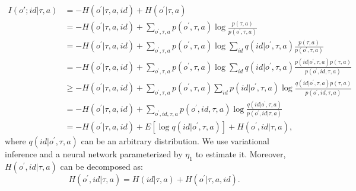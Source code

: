 \begin{equation}
\begin{aligned} 
I(o'; id | \tau, a) &=-H\left(o^{\prime} | \tau, a, id\right)+H\left(o^{\prime} | \tau, a\right) 
\\ &= -H\left(o^{\prime} | \tau, a, id\right)+ \sum_{o^{\prime}, \tau, a}p(o^{\prime}, \tau, a)\log \frac{p(\tau, a)}{p(o^{\prime}, \tau, a)}
\\ &= -H\left(o^{\prime} | \tau, a, id\right)+\sum_{o^{\prime}, \tau, a}p(o^{\prime}, \tau, a)\log \sum_{id} q\left(id | o^{\prime}, \tau, a\right)\frac{p(\tau, a)}{p(o^{\prime}, \tau, a)}
\\ &= -H\left(o^{\prime} | \tau, a, id\right)+\sum_{o^{\prime}, \tau, a}p(o^{\prime}, \tau, a)\log \sum_{id} q\left(id | o^{\prime}, \tau, a\right)\frac{p(id|o^{\prime}, \tau, a)p(\tau, a)}{p(o^{\prime}, id, \tau, a)}
\\ & \geq -H\left(o^{\prime} | \tau, a, id\right)+\sum_{o^{\prime}, \tau, a}p(o^{\prime}, \tau, a)\sum_{id} p\left(id | o^{\prime}, \tau, a\right)\log \frac{q(id|o^{\prime}, \tau, a)p(\tau, a)}{p(o^{\prime}, id, \tau, a)}
\\ & = -H\left(o^{\prime} | \tau, a, id\right)+\sum_{o^{\prime}, id, \tau, a}p(o^{\prime}, id, \tau, a)\log \frac{q(id|o^{\prime}, \tau, a)}{p(o^{\prime}, id| \tau, a)}
\\ & = -H\left(o^{\prime} | \tau, a, id\right)+E\left[\log q\left(id | o^{\prime}, \tau, a\right)\right]+H\left(o^{\prime}, id | \tau, a\right),
\end{aligned}
\label{eq:elbo_r2}
\end{equation}
where $q(id|o^{\prime}, \tau, a)$ can be an arbitrary distribution. We use variational inference and a neural network parameterized by $\eta_1$ to estimate it. Moreover, $H\left(o^{\prime}, i d | \tau, a\right)$ can be decomposed as:
\begin{equation}
H\left(o^{\prime}, id | \tau, a\right)=H(id | \tau, a)+H\left(o^{\prime}| \tau, a, id \right).
\label{eq:entropy_decompose}
\end{equation}
